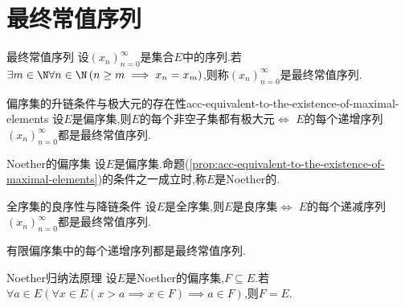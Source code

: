 \section{最终常值序列}

\begin{definition}{最终常值序列}{}
	设$\left(x_{n}\right)_{n=0}^{\infty}$是集合$E$中的序列.若$\exists m\in\N\forall n\in\N\left(n\geq m\implies x_{n}=x_{m}\right)$,则称$\left(x_{n}\right)_{n=0}^{\infty}$是最终常值序列.
\end{definition}

\begin{proposition}{偏序集的升链条件与极大元的存在性}{acc-equivalent-to-the-existence-of-maximal-elements}
	设$E$是偏序集,则$E$的每个非空子集都有极大元$\iff$ $E$的每个递增序列$\left(x_{n}\right)_{n=0}^{\infty}$都是最终常值序列.
\end{proposition}

\begin{definition}{Noether的偏序集}{}
	设$E$是偏序集.命题(\cref{prop:acc-equivalent-to-the-existence-of-maximal-elements})的条件之一成立时,称$E$是Noether的.
\end{definition}

\begin{corollary}{全序集的良序性与降链条件}{}
	设$E$是全序集,则$E$是良序集$\iff$ $E$的每个递减序列$\left(x_{n}\right)_{n=0}^{\infty}$都是最终常值序列.
\end{corollary}

\begin{corollary}{}{}
	有限偏序集中的每个递增序列都是最终常值序列.
\end{corollary}

\begin{proposition}{Noether归纳法原理}{}
	设$E$是Noether的偏序集,$F\subseteq E$.若$\forall a\in E\left(\forall x\in E\left(x>a\implies x\in F\right)\implies a\in F\right)$,则$F=E$.
\end{proposition}








































